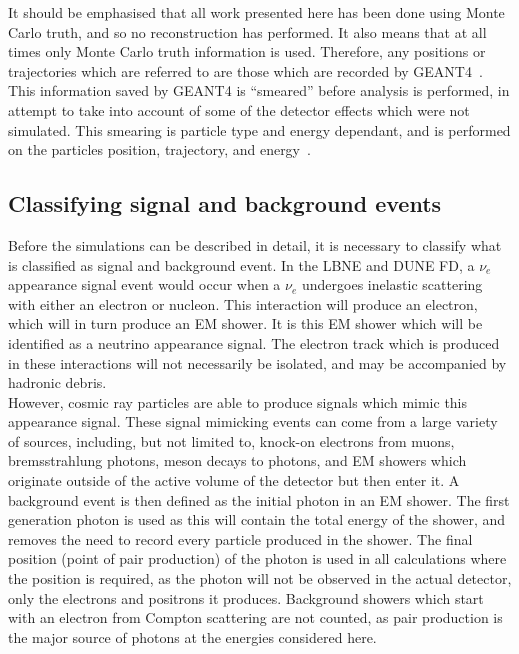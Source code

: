 It should be emphasised that all work presented here has been done using Monte Carlo truth, and so no reconstruction has performed. It also means that at all times only Monte Carlo truth information is used. Therefore, any positions or trajectories which are referred to are those which are recorded by GEANT4~\citep{GEANT4}. This information saved by GEANT4 is ``smeared'' before analysis is performed, in attempt to take into account of some of the detector effects which were not simulated. This smearing is particle type and energy dependant, and is performed on the particles position, trajectory, and energy~\citep{MartinsThesis, LBNE7806}. \\

\subsection{Classifying signal and background events}
Before the simulations can be described in detail, it is necessary to classify what is classified as signal and background event. In the LBNE and DUNE FD, a $\nu_{e}$ appearance signal event would occur when a $\nu_{e}$ undergoes inelastic scattering with either an electron or nucleon. This interaction will produce an electron, which will in turn produce an EM shower. It is this EM shower which will be identified as a neutrino appearance signal. The electron track which is produced in these interactions will not necessarily be isolated, and may be accompanied by hadronic debris. \\

However, cosmic ray particles are able to produce signals which mimic this appearance signal. These signal mimicking events can come from a large variety of sources, including, but not limited to, knock-on electrons from muons, bremsstrahlung photons, meson decays to photons, and EM showers which originate outside of the active volume of the detector but then enter it. A background event is then defined as the initial photon in an EM shower. The first generation photon is used as this will contain the total energy of the shower, and removes the need to record every particle produced in the shower. The final position (point of pair production) of the photon is used in all calculations where the position is required, as the photon will not be observed in the actual detector, only the electrons and positrons it produces. Background showers which start with an electron from Compton scattering are not counted, as pair production is the major source of photons at the energies considered here. \\

